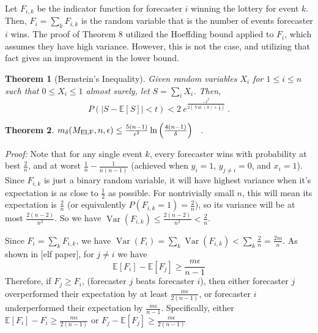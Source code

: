 \documentclass[letterpaper,12pt]{article}
\DeclareMathOperator*{\Var}{Var}
\newcommand{\E}{\mathbb{E}}
\newcommand{\1}{\mathbbm{1}}
\newtheorem{theorem}{Theorem}
\begin{document}
Let $F_{i, k}$ be the indicator function for forecaster $i$ winning the lottery for event $k$. Then, $F_i = \sum_k F_{i, k}$ is the random variable that is the number of events forecaster $i$ wins. The proof of Theorem 8 \cite{elf} utilized the Hoeffding bound applied to $F_i$, which assumes they have high variance. However, this is not the case, and utilizing that fact gives an improvement in the lower bound. 
\begin{theorem}[Bernstein's Inequality]
  \label{bernstein}
  Given random variables $X_i$ for $1 \leq i \leq n$ such that $0 \leq X_i \leq 1$ almost surely, let $S = \sum_i X_i$. Then,
  \[ P\left(|S - \E[S]| < t\right) < 2 \: e^{\frac{-t^2 }{2\left(\Var(S) + \frac{t}{3}\right)} } ~.\]
\end{theorem}
\begin{theorem}
  \label{elf_bound}
    $m_\delta(M_{\mathrm{ELF}}, n, \epsilon) \leq \frac{5(n-1)}{\epsilon^2}\ln\left(\frac{4(n-1)}{\delta}\right)$ ~.
\end{theorem}
\emph{Proof:} Note that for any single event $k$, every forecaster wins with probability at best $\frac{2}{n}$, and at worst $\frac{1}{n} - \frac{1}{n(n-1)}$ (achieved when $y_i = 1$, $y_{j\neq i} = 0$, and $x_i = 1$). Since $F_{i, k}$ is just a binary random variable, it will have highest variance when it's expectation is as close to $\frac{1}{2}$ as possible. For nontrivially small $n$, this will mean its expectation is $\frac{2}{n}$ (or equivalently $P(F_{i, k} = 1) = \frac{2}{n}$), so its variance will be at most $\frac{2(n-2)}{n^2}$. So we have $\Var(F_{i, k}) \leq \frac{2(n-2)}{n^2} < \frac{2}{n}$. 

Since $F_i = \sum_k F_{i, k}$, we have $\Var(F_i) = \sum_k \Var(F_{i, k}) < \sum_k \frac{2}{n} = \frac{2m}{n}$. As shown in [elf paper], for $j\neq i$ we have 
\[ \E[F_i] - \E[F_j] \geq \frac{m \epsilon}{n - 1}\]
Therefore, if $F_j \geq F_i$, (forecaster $j$ beats forecaster $i$), then either forecaster $j$ overperformed their expectation by at least $\frac{m \epsilon}{2(n - 1)}$, or forecaster $i$ underperformed their expectation by $\frac{m \epsilon}{n - 1}$. Specifically, either $\E[F_i] - F_i \geq \frac{m \epsilon}{2(n - 1)}$ or $F_j - \E[F_j] \geq \frac{m \epsilon}{2(n - 1)}$
\end{document}
